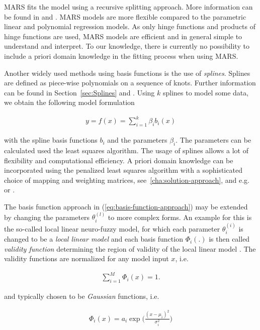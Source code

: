 MARS fits the model using a recursive splitting approach. More information can be found in \cite{friedman1991multivariate} and \cite{friedman2001elements}. MARS models are more flexible compared to the parametric linear and polynomial regression models. As only hinge functions and products of hinge functions are used, MARS models are efficient and in general simple to understand and interpret. To our knowledge, there is currently no possibility to include a priori domain knowledge in the fitting process when using MARS. 

Another widely used methods using basis functions is the use of \emph{splines}. Splines are defined as piece-wise polynomials on a sequence of knots. Further information can be found in Section~\ref{sec:Splines} and \cite{deBoor1978practicalGuideToSplines}. Using $k$ splines to model some data, we obtain the following model formulation

\begin{align} \label{eq:Spline-basis-formulation}
	y = f(x) = \sum_{i=1}^k \beta_i b_i(x) 
\end{align}

with the spline basis functions $b_i$ and the parameters $\beta_i$. The parameters can be calculated used the least squares algorithm. The usage of splines allows a lot of flexibility and computational efficiency. A priori domain knowledge can be incorporated using the penalized least squares algorithm with a sophisticated choice of mapping and weighting matrices, see~\ref{cha:solution-approach}, and e.g. \cite{hofner2011monotonicity} or \cite{bollaerts2006simple}.

The basis function approach in (\ref{eq:basis-function-approach}) may be extended by changing the parameters $\theta_i^{(l)}$ to more complex forms. An example for this is the so-called local linear neuro-fuzzy model, for which each parameter $\theta_i^{(i)}$ is changed to be a \emph{local linear model} and each basis function $\Phi_i(.)$ is then called \emph{validity function} determining the region of validity of the local linear model \cite{nelles2013nonlinear}. The validity functions are normalized for any model input $x$, i.e.

\begin{align} \label{eq:LILOMOT-normalized-basis-fucntions}
	\sum_{i=1}^M \Phi_i(x) = 1.
\end{align}

and typically chosen to be \emph{Gaussian} functions, i.e. 

\begin{align} \label{eq:validity-function}
	\Phi_i(x) = a_i \exp \big(\frac{(x - \mu_i)^2}{\sigma_i^2} \big)	
\end{align}

